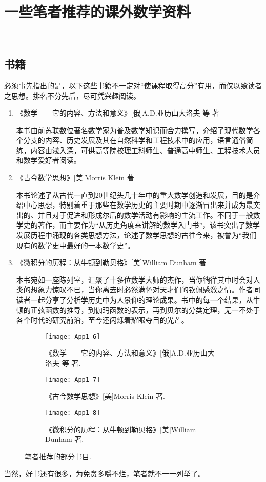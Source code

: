 \section{一些笔者推荐的课外数学资料}
~
  \subsection{书籍}
    \hspace*{2em}必须事先指出的是，以下这些书籍不一定对“使课程取得高分”有用，而仅以飨读者之思想。排名不分先后，尽可凭兴趣阅读。
  \begin{enumerate}[label=(\arabic*),leftmargin=4em]
    \item 《数学——它的内容、方法和意义》[俄]A.D.亚历山大洛夫 等 著

    本书由前苏联数位著名数学家为普及数学知识而合力撰写，介绍了现代数学各个分支的内容、历史发展及其在自然科学和工程技术中的应用，语言通俗简练，内容由浅入深，可供高等院校理工科师生、普通高中师生、工程技术人员和数学爱好者阅读。

    \item 《古今数学思想》[美]Morris Klein 著

    本书论述了从古代一直到20世纪头几十年中的重大数学创造和发展，目的是介绍中心思想，特别着重于那些在数学历史的主要时期中逐渐冒出来并成为最突出的、并且对于促进和形成尔后的数学活动有影响的主流工作。不同于一般数学史的著作，而主要作为“从历史角度来讲解的数学入门书”，该书突出了数学发展历程中涌现的各类思想方法，论述了数学思想的古往今来，被誉为“我们现有的数学史中最好的一本数学史”。

    \item 《微积分的历程：从牛顿到勒贝格》[美]William Dunham 著

    本书宛如一座陈列室，汇聚了十多位数学大师的杰作，当你徜徉其中时会对人类的想象力惊叹不已，当你离去时必然满怀对天才们的钦佩感激之情。作者同读者一起分享了分析学历史中为人景仰的理论成果。书中的每一个结果，从牛顿的正弦函数的推导，到伽玛函数的表示，再到贝尔的分类定理，无一不处于各个时代的研究前沿，至今还闪烁着耀眼夺目的光芒。
  \end{enumerate}
    \begin{figure}[!htb]
    \hfill
    \begin{subfigure}[b]{.23\textwidth}
      \centering
      \texttt{[image: App1\_6]}
      \caption{《数学——它的内容、方法和意义》[俄]A.D.亚历山大洛夫 等 著.}
    \end{subfigure}
    \hfill
    \begin{subfigure}[b]{.23\textwidth}
      \centering
      \texttt{[image: App1\_7]}
      \caption{《古今数学思想》[美]Morris Klein 著.}
    \end{subfigure}
    \hfill
    \begin{subfigure}[b]{.23\textwidth}
      \centering
      \texttt{[image: App1\_8]}
      \caption{《微积分的历程：从牛顿到勒贝格》[美]William Dunham 著.}
    \end{subfigure}
    \caption{笔者推荐的部分书目.}
  \end{figure}
  \hspace*{2em}当然，好书还有很多，为免贪多嚼不烂，笔者就不一一列举了。

